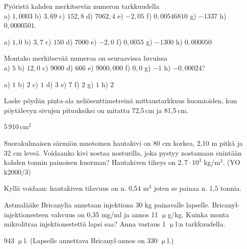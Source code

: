 \begin{tehtavasivu}
\begin{tehtava}
Pyöristä kahden merkitsevän numeron tarkkuudella \\
a) $1,0003$ \qquad
b) $3,69$ \qquad
c) $152,8$ \qquad
d) $7062,4$ \qquad
e) $-2,05$ \qquad
f) $0,00546810$ \qquad
g) $-1337$ \qquad
h) $0,0000501$.
\begin{vastaus}
a) $1,0$ \qquad
b) $3,7$ \qquad
c) $150$ \qquad
d) $7000$ \qquad
e) $-2,0$ \qquad
f) $0,0055$ \qquad
g) $-1300$ \qquad
h) $0,000050$
\end{vastaus}
\end{tehtava}

\begin{tehtava}
Montako merkitsevää numeroa on seuraavissa luvuissa \\
a) $5$ \qquad
b) $12,0$ \qquad
c) $9000$ \qquad
d) $666$ \qquad
e) $9000,000$ \qquad
f) $0,0$ \qquad
g) $-1$ \qquad
h) $-0,00024$?
\begin{vastaus}
a) $1$ \qquad
b) $2$ \qquad
c) $1$ \qquad
d) $3$ \qquad
e) $7$ \qquad
f) $2$ \qquad
g) $1$ \qquad
h) $2$
\end{vastaus}
\end{tehtava}


\begin{tehtava}
Laske pöydän pinta-ala neliösenttimetreinä mittaustarkkuus huomioiden,
kun pöytälevyn sivujen pituuksiksi on mitattu 72,5\,cm ja 81,5\,cm.
\begin{vastaus}
5\,910\,cm$^2$
\end{vastaus}
\end{tehtava}

\begin{tehtava}
Suorakulmaisen särmiön muotoinen hautakivi on 80 cm korkea, 2,10 m pitkä ja 32 cm leveä.
Voidaanko kivi nostaa nosturilla, joka pystyy nostamaan enintään kahden tonnin painoisen kuorman? Hautakiven tiheys on $2,7 \cdot 10^3$ kg/m$^3$. (YO k2000/3)
\begin{vastaus}
Kyllä voidaan: hautakiven tilavuus on n. 0,54 m$^3$ joten se painaa n. 1,5 tonnia.
\end{vastaus}
\end{tehtava}

\begin{tehtava}
Astmalääke Bricanylia annetaan injektiona 30 kg painavalle lapselle. Bricanyl-injektionesteen vahvuus on 0,35 mg/ml ja annos 11 $\upmu$g/kg. Kuinka monta mikrolitraa injektionestettä lapsi saa? Anna vastaus 1 $\upmu$l:n tarkkuudella.
 \begin{vastaus}
  943 $\upmu$l. (Lapselle annettava Bricanyl-annos on 330 $\upmu$l.)
 \end{vastaus}
\end{tehtava}


\end{tehtavasivu}

